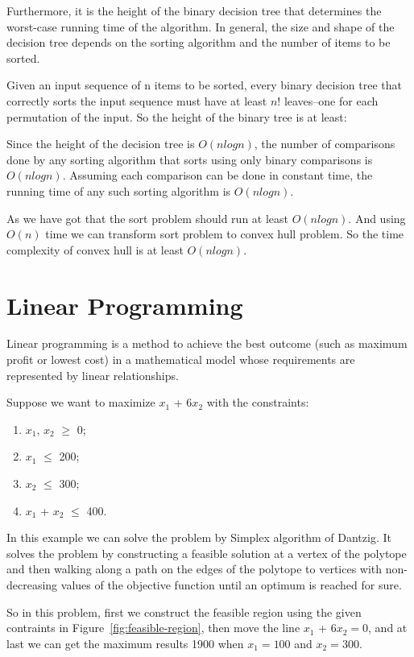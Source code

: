 \documentclass[usletter]{article}
\begin{document}
Furthermore, it is the height of the binary decision tree that determines the worst-case running time of the algorithm. In general, the size and shape of the decision tree depends on the sorting algorithm and the number of items to be sorted. 

Given an input sequence of n items to be sorted, every binary decision tree that correctly sorts the input sequence must have at least $n!$ leaves--one for each permutation of the input. So the height of the binary tree is at least:


Since the height of the decision tree is  $O(nlogn)$, the number of comparisons done by any sorting algorithm that sorts using only binary comparisons is  $O(nlogn)$. Assuming each comparison can be done in constant time, the running time of any such sorting algorithm is  $O(nlogn)$. 

As we have got that the sort problem should run at least $O(nlogn)$. And using $O(n)$ time we can transform sort problem to convex hull problem. So the time complexity of convex hull is at least  $O(nlogn)$.

\section{Linear Programming}
Linear programming is a method to achieve the best outcome (such as maximum profit or lowest cost) in a mathematical model whose requirements are represented by linear relationships.

Suppose we want to maximize $x_{1}$ + 6$x_{2}$ with the constraints:
\begin{enumerate}
	\item $x_{1}$, $x_{2}$ $\geq$ 0;
	\item $x_{1}$ $\le$ 200;
	\item $x_{2}$ $\le$ 300;
	\item $x_{1}$ + $x_{2}$ $\le$ 400.
\end{enumerate}

In this example we can solve the problem by Simplex algorithm of Dantzig. It solves the problem by constructing a feasible solution at a vertex of the polytope and then walking along a path on the edges of the polytope to vertices with non-decreasing values of the objective function until an optimum is reached for sure. 

So in this problem, first we construct the feasible region using the given contraints in Figure~\ref{fig:feasible-region}, then move the line $x_{1}$ + 6$x_{2}=0$, and at last we can get the maximum results 1900 when $x_{1}=100$  and $x_{2}=300$.
\end{document}
